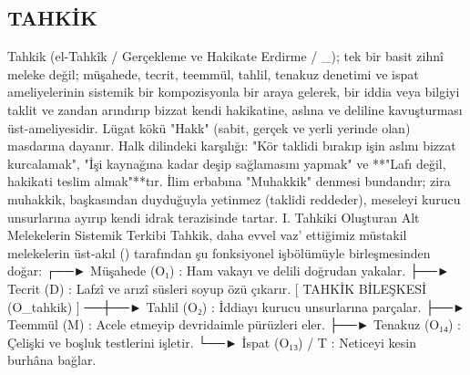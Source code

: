 \documentclass[11pt,a4paper]{article}
\begin{document}
\subsection{TAHKİK}




Tahkik (el-Tahkîk / Gerçekleme ve Hakikate Erdirme / _{}); tek bir basit zihnî meleke değil; müşahede, tecrit, teemmül, tahlil, tenakuz denetimi ve ispat ameliyelerinin sistemik bir kompozisyonla bir araya gelerek, bir iddia veya bilgiyi taklit ve zandan arındırıp bizzat kendi hakikatine, aslına ve deliline kavuşturması üst-ameliyesidir.
Lügat kökü "Hakk" (sabit, gerçek ve yerli yerinde olan) masdarına dayanır. Halk dilindeki karşılığı: "Kör taklidi bırakıp işin aslını bizzat kurcalamak", "İşi kaynağına kadar deşip sağlamasını yapmak" ve **"Lafı değil, hakikati teslim almak"**tır.
İlim erbabına "Muhakkik" denmesi bundandır; zira muhakkik, başkasından duyduğuyla yetinmez (taklidi reddeder), meseleyi kurucu unsurlarına ayırıp kendi idrak terazisinde tartar.
I. Tahkiki Oluşturan Alt Melekelerin Sistemik Terkibi
Tahkik, daha evvel vaz' ettiğimiz müstakil melekelerin üst-akıl () tarafından şu fonksiyonel işbölümüyle birleşmesinden doğar:
                                  ┌──► Müşahede (O₁)   : Ham vakayı ve delili doğrudan yakalar.
                                  ├──► Tecrit (D)      : Lafzî ve arızî süsleri soyup özü çıkarır.
[ TAHKİK BİLEŞKESİ (O_tahkik) ] ──┼──► Tahlil (O₂)     : İddiayı kurucu unsurlarına parçalar.
                                  ├──► Teemmül (M)     : Acele etmeyip devridaimle pürüzleri eler.
                                  ├──► Tenakuz (O₁₄)   : Çelişki ve boşluk testlerini işletir.
                                  └──► İspat (O₁₃) / T : Neticeyi kesin burhâna bağlar.
\end{document}
